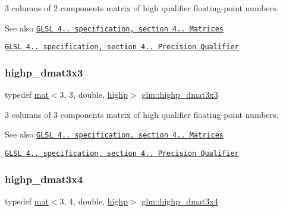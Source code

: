 3 columns of 2 components matrix of high qualifier floating-\/point numbers.

\begin{DoxySeeAlso}{See also}
\href{http://www.opengl.org/registry/doc/GLSLangSpec.4.20.8.pdf}{\tt G\+L\+SL 4.. specification, section 4.. Matrices} 

\href{http://www.opengl.org/registry/doc/GLSLangSpec.4.20.8.pdf}{\tt G\+L\+SL 4.. specification, section 4.. Precision Qualifier} 
\end{DoxySeeAlso}
\mbox{\label{group__core__precision_gae5f677e4437523476511c84a17206ac2}} 
\subsubsection{\texorpdfstring{highp\+\_\+dmat3x3}{highp\_dmat3x3}}
{\footnotesize\ttfamily typedef \mbox{\hyperlink{structglm_1_1mat}{mat}}$<$3, 3, double, \mbox{\hyperlink{namespaceglm_a36ed105b07c7746804d7fdc7cc90ff25ac6f7eab42eacbb10d59a58e95e362074}{highp}}$>$ \mbox{\hyperlink{group__core__precision_gae5f677e4437523476511c84a17206ac2}{glm\+::highp\+\_\+dmat3x3}}}

3 columns of 3 components matrix of high qualifier floating-\/point numbers.

\begin{DoxySeeAlso}{See also}
\href{http://www.opengl.org/registry/doc/GLSLangSpec.4.20.8.pdf}{\tt G\+L\+SL 4.. specification, section 4.. Matrices} 

\href{http://www.opengl.org/registry/doc/GLSLangSpec.4.20.8.pdf}{\tt G\+L\+SL 4.. specification, section 4.. Precision Qualifier} 
\end{DoxySeeAlso}
\mbox{\label{group__core__precision_ga21d3883c59ff3949404de6713e86c89e}} 
\subsubsection{\texorpdfstring{highp\+\_\+dmat3x4}{highp\_dmat3x4}}
{\footnotesize\ttfamily typedef \mbox{\hyperlink{structglm_1_1mat}{mat}}$<$3, 4, double, \mbox{\hyperlink{namespaceglm_a36ed105b07c7746804d7fdc7cc90ff25ac6f7eab42eacbb10d59a58e95e362074}{highp}}$>$ \mbox{\hyperlink{group__core__precision_ga21d3883c59ff3949404de6713e86c89e}{glm\+::highp\+\_\+dmat3x4}}}

